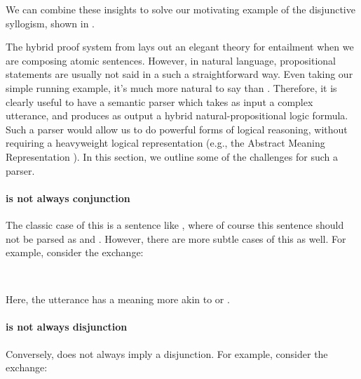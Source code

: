We can combine these insights to solve our motivating example of the disjunctive
  syllogism, shown in .



%
%
%
The hybrid proof system from  lays out an elegant theory
  for entailment when we are composing atomic sentences.
However, in natural language, propositional statements are usually not said in a such a straightforward
  way.
Even taking our simple running example, it's much more natural to say
   than .
Therefore, it is clearly useful to have a semantic parser which takes as input a complex
  utterance, and produces as output a hybrid natural-propositional logic formula.
Such a parser would allow us to do powerful forms of logical reasoning, without requiring
  a heavyweight logical representation (e.g., the Abstract Meaning Representation 
  \cite{key:2013banarescu-amr}).
In this section, we outline some of the challenges for such a parser.


\paragraph{ is not always conjunction}
The classic case of this is a sentence like , where of course
  this sentence should not be parsed as  and .
However, there are more subtle cases of this as well.
For example, consider the exchange:

\begin{displayquote}
 \\
\end{displayquote}

Here, the utterance  has a meaning more akin to
   or .


\paragraph{ is not always disjunction}
Conversely,  does not always imply a disjunction.
For example, consider the exchange:

\begin{displayquote}
 \\
\end{displayquote}

